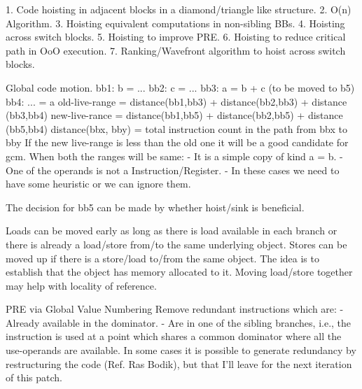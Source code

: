 \begin{section}

1. Code hoisting in adjacent blocks in a diamond/triangle like structure.
2. O(n) Algorithm.
3. Hoisting equivalent computations in non-sibling BBs.
4. Hoisting across switch blocks.
5. Hoisting to improve PRE.
6. Hoisting to reduce critical path in OoO execution.
7. Ranking/Wavefront algorithm to hoist across switch blocks.

Global code motion.
 bb1: b = ...
 bb2: c = ...
 bb3: a = b + c (to be moved to b5)
 bb4: ... = a
 old-live-range = distance(bb1,bb3) + distance(bb2,bb3) + distance (bb3,bb4)
 new-live-rance = distance(bb1,bb5) + distance(bb2,bb5) + distance (bb5,bb4)
 distance(bbx, bby) = total instruction count in the path from bbx to bby
 If the new live-range is less than the old one it will be a good candidate
 for gcm. When both the ranges will be same:
  - It is a simple copy of kind a = b.
  - One of the operands is not a Instruction/Register.
  - In these cases we need to have some heuristic or we can ignore them.

 The decision for bb5 can be made by whether hoist/sink is beneficial.

 Loads can be moved early as long as there is load available in each branch
 or there is already a load/store from/to the same underlying object.
 Stores can be moved up if there is a store/load to/from the same object.
 The idea is to establish that the object has memory allocated to it.
 Moving load/store together may help with locality of reference.

 PRE via Global Value Numbering
 Remove redundant instructions which are:
  - Already available in the dominator.
  - Are in one of the sibling branches, i.e., the instruction is used at
    a point which shares a common dominator where all the use-operands
    are available.
 In some cases it is possible to generate redundancy by restructuring the code
 (Ref. Ras Bodik), but that I'll leave for the next iteration of this patch.



\end{section}
